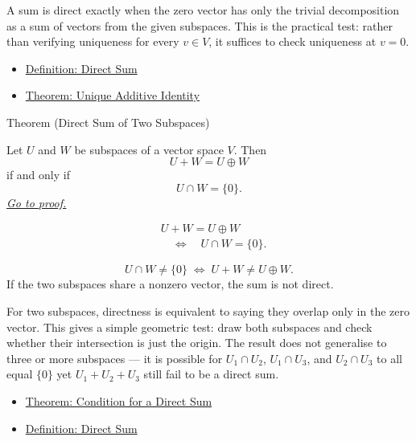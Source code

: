 \begin{remark*}[Interpretation]
A sum is direct exactly when the zero vector has only the trivial
decomposition as a sum of vectors from the given subspaces. This is the
practical test: rather than verifying uniqueness for every $v \in V$,
it suffices to check uniqueness at $v = 0$.
\end{remark*}

\begin{remark*}[Dependencies]
\begin{itemize}
  \item \hyperref[def:direct-sum]{Definition: Direct Sum}
  \item \hyperref[thm:unique-additive-identity]{Theorem: Unique Additive Identity}
\end{itemize}
\end{remark*}


\begin{theorembox}{Theorem (Direct Sum of Two Subspaces)}
\begin{theorem}
\label{thm:direct-sum-of-two-subspaces}
Let $U$ and $W$ be subspaces of a vector space $V$.
Then
\[
U+W=U\oplus W
\]
if and only if
\[
U \cap W = \{0\}.
\]
\hyperref[prf:direct-sum-of-two-subspaces]{\textit{Go to proof.}}
\end{theorem}
\end{theorembox}

\begin{remark*}
\[
\begin{aligned}
&U+W=U\oplus W \\
&\quad\Longleftrightarrow\quad
U \cap W = \{0\}.
\end{aligned}
\]
\end{remark*}

\begin{remark*}
\[
U \cap W \neq \{0\}
\;\Longleftrightarrow\;
U + W \neq U \oplus W.
\]
If the two subspaces share a nonzero vector, the sum is not direct.
\end{remark*}

\begin{remark*}[Interpretation]
For two subspaces, directness is equivalent to saying they overlap only
in the zero vector. This gives a simple geometric test: draw both subspaces
and check whether their intersection is just the origin. The result does not
generalise to three or more subspaces --- it is possible for $U_1\cap U_2$,
$U_1\cap U_3$, and $U_2\cap U_3$ to all equal $\{0\}$ yet $U_1+U_2+U_3$
still fail to be a direct sum.
\end{remark*}

\begin{remark*}[Dependencies]
\begin{itemize}
  \item \hyperref[thm:condition-for-direct-sum]{Theorem: Condition for a Direct Sum}
  \item \hyperref[def:direct-sum]{Definition: Direct Sum}
\end{itemize}
\end{remark*}

